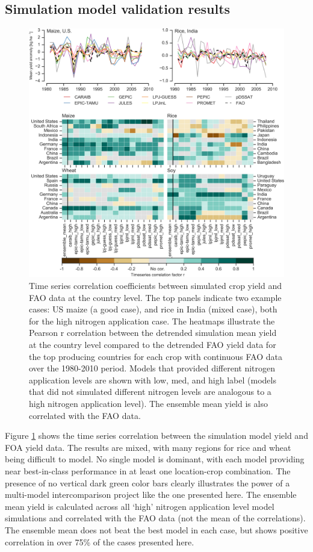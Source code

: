 \documentclass[preprint, 5p, times, twocolumn]{elsarticle}
\begin{document}
{\subsection{Simulation model validation results}
\begin{figure}[!htb]
    \centering
    \includegraphics[width=0.95\linewidth]{figures/Agformet_validation.png}
    \caption{Time series correlation coefficients between simulated crop yield and FAO data at the country level. The top panels indicate two example cases: US maize (a good case), and rice in India (mixed case), both for the high nitrogen application case. The heatmaps illustrate the Pearson r correlation between the detrended simulation mean yield at the country level compared to the detrended FAO yield data for the top producing countries for each crop with continuous FAO data over the 1980-2010 period. Models that provided different nitrogen application levels are shown with low, med, and high label (models that did not simulated different nitrogen levels are analogous to a high nitrogen application level). The ensemble mean yield is also correlated with the FAO data.}
    \label{fig:simulation_val}
\end{figure}

Figure \ref{fig:simulation_val} shows the time series correlation between the simulation model yield and FOA yield data. The results are mixed, with many regions for rice and wheat being difficult to model. No single model is dominant, with each model providing near best-in-class performance in at least one location-crop combination. The presence of no vertical dark green color bars clearly illustrates the power of a multi-model intercomparison project like the one presented here. The ensemble mean yield is calculated across all `high' nitrogen application level model simulations and correlated with the FAO data (not the mean of the correlations). The ensemble mean does not beat the best model in each case, but shows positive correlation in over 75\% of the cases presented here.

}
\end{document}
